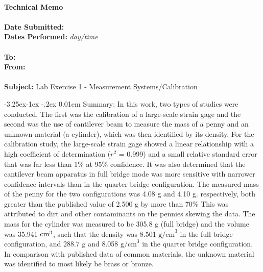 \documentclass[12pt, letterpaper]{article}
\newcommand{\z}[1]{\text{#1}} %
\begin{document}


\makeatletter
\renewcommand\paragraph{%
    \@startsection{paragraph}{4}{\z@}%
    {-3.25ex\@plus -1ex \@minus -.2ex}%
    {0.01em}%
    {\normalfont\normalsize\bfseries}}
\makeatother

 \\
{\bf Technical Memo} \\
\\{\bf Date Submitted: }
\\{\bf Dates Performed: } \textit{day/time} \\
\\{\bf To: }
\\{\bf From: } \\
\\{\bf Subject: } Lab Exercise 1 - Measurement Systems/Calibration

\doublespacing
\paragraph{Summary:} In this work, two types of studies were conducted. The
first was the calibration of a large-scale strain gage and the second was the
use of cantilever beam to measure the mass of a penny and an unknown material
(a cylinder), which was then identified by its density. For the calibration
study, the large-scale strain gage showed a linear relationship with a high
coefficient of determination ($r^2$ = 0.999) and a small relative standard
error that was far less than 1\% at 95\% confidence. It was also determined
that the cantilever beam apparatus in full bridge mode was more sensitive with
narrower confidence intervals than in the quarter bridge configuration. The
measured mass of the penny for the two configurations was 4.08 g and 4.10 g.
respectively, both greater than the published value of 2.500 g by more than
70\% This was attributed to dirt and other contaminants on the pennies skewing
the data. The mass for the cylinder was measured to be 305.8 g (full bridge)
and the volume was 35.941 $\z{\z{cm}}^3$, such that the density was 8.501
$\z{g/cm}^3$ in the full bridge configuration, and 288.7 g and 8.058
$\z{g/cm}^3$ in the quarter bridge configuration. In comparison with published
data of common materials, the unknown material was identified to most likely be
brass or bronze.
\end{document}
